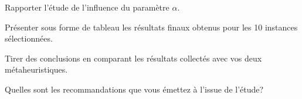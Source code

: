 \noindent
Rapporter l'étude de l'influence du paramètre $\alpha$.

\noindent
Présenter sous forme de tableau les résultats finaux obtenus pour les 10 instances sélectionnées.

%
%

\vspace{5mm}
\noindent
{}
\vspace{2mm}

\noindent
Tirer des conclusions en comparant les résultats collectés avec vos deux métaheuristiques.

\noindent
Quelles sont les recommandations que vous émettez à l'issue de l'étude?


